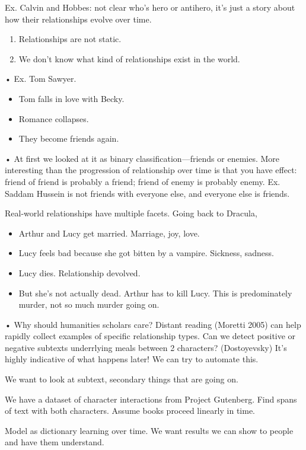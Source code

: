 Ex. Calvin and Hobbes: not clear who's hero or antihero, it's just a story about how their relationships evolve over time.
\begin{enumerate}
\item
Relationships are not static.
\item
We don't know what kind of relationships exist in the world.
\end{enumerate}•
Ex. Tom Sawyer.
\begin{itemize}
\item
Tom falls in love with Becky.
\item
Romance collapses.
\item 
They become friends again.
\end{itemize}•
At first we looked at it as binary classification---friends or enemies. 
More interesting than the progression of relationship over time is that you have effect: friend of friend is probably a friend; friend of enemy is probably enemy. Ex. Saddam Hussein is not friends with everyone else, and everyone else is friends. 

Real-world relationships have multiple facets. 
Going back to Dracula,
\begin{itemize}
\item
Arthur and Lucy get married. Marriage, joy, love.
\item
Lucy feels bad because she got bitten by a vampire. Sickness, sadness.
\item
Lucy dies. Relationship devolved.
\item
But she's not actually dead. Arthur has to kill Lucy. This is predominately murder, not so much murder going on.
\end{itemize}•
Why should humanities scholars care? Distant reading (Moretti 2005) can help rapidly collect examples of specific relationship types. Can we detect positive or negative subtexts underrlying meals between 2 characters? (Dostoyevsky) It's highly indicative of what happens later! We can try to automate this.

We want to look at subtext, secondary things that are going on.

We have a dataset of character interactions from Project Gutenberg. %
Find spans of text with both characters.
Assume books proceed linearly in time.

Model as dictionary learning over time. %
We want results we can show to people and have them understand. 

